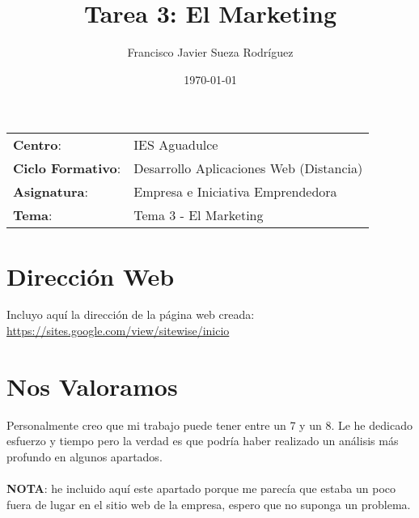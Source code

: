 


\title{
\vspace{10ex}
\normalfont \normalsize
\huge \textbf{Tarea 3: El Marketing}
}
\author{Francisco Javier Sueza Rodríguez}
\date{\normalsize\today}



\maketitle

\thispagestyle{empty}

\vspace{65ex}

\begin{center}
    \begin{tabular}{l l}
        \textbf{Centro}: & IES Aguadulce \\
        \textbf{Ciclo Formativo}: & Desarrollo Aplicaciones Web (Distancia)\\
        \textbf{Asignatura}: & Empresa e Iniciativa Emprendedora\\
        \textbf{Tema}: & Tema 3 -  El Marketing\\
    \end{tabular}
\end{center}

\newpage

\section*{Dirección Web}
Incluyo aquí la dirección de la página web creada: \url{https://sites.google.com/view/sitewise/inicio}

\section*{Nos Valoramos}
Personalmente creo que mi trabajo puede tener entre un 7 y un 8. Le he dedicado esfuerzo y tiempo pero la verdad es que podría haber realizado un análisis más profundo en algunos apartados. \\ \\

\textbf{NOTA}: he incluido aquí este apartado porque me parecía que estaba un poco fuera de lugar en el sitio web de la empresa, espero que no suponga un problema.


%
%

